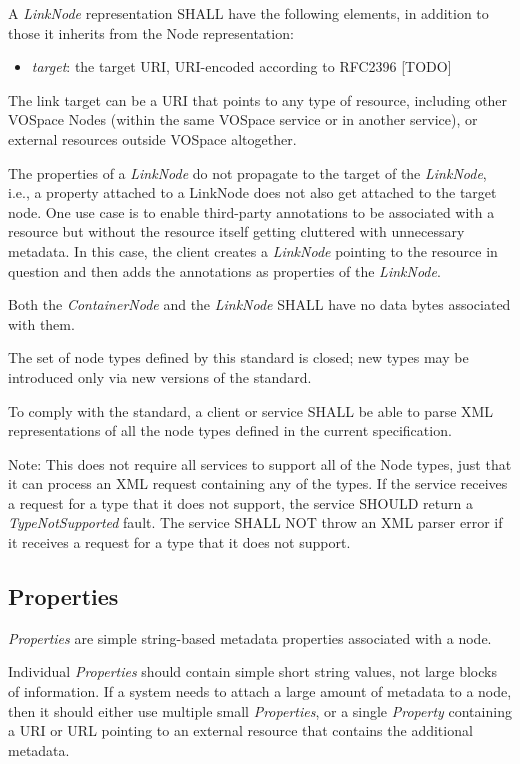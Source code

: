 \documentclass[11pt,a4paper]{ivoa}
\begin{document}
A \emph{LinkNode} representation SHALL have the following elements, in addition to those it inherits from the Node representation:

\begin{itemize}
    \item \emph{target}: the target URI, URI-encoded according to RFC2396 [TODO]
\end{itemize}

The link target can be a URI that points to any type of resource, including other VOSpace Nodes (within the same VOSpace service or in another service), or external resources outside VOSpace altogether.

The properties of a \emph{LinkNode} do not propagate to the target of the \emph{LinkNode}, i.e., a property attached to a LinkNode does not also get attached to the target node. One use case is to enable third-party annotations to be associated with a resource but without the resource itself getting cluttered with unnecessary metadata. In this case, the client creates a \emph{LinkNode} pointing to the resource in question and then adds the annotations as properties of the \emph{LinkNode}.

Both the \emph{ContainerNode} and the \emph{LinkNode} SHALL have no data bytes associated with them.

The set of node types defined by this standard is closed; new types may be introduced only via new versions of the standard.

To comply with the standard, a client or service SHALL be able to parse XML representations of all the node types defined in the current specification.

Note: This does not require all services to support all of the Node types, just that it can process an XML request containing any of the types. If the service receives a request for a type that it does not support, the service SHOULD return a \emph{TypeNotSupported} fault. The service SHALL NOT throw an XML parser error if it receives a request for a type that it does not support.

\subsection{Properties}
\label{subsec:properties}
\emph{Properties} are simple string-based metadata properties associated with a node.

Individual \emph{Properties} should contain simple short string values, not large blocks of information. If a system needs to attach a large amount of metadata to a node, then it should either use multiple small \emph{Properties}, or a single \emph{Property} containing a URI or URL pointing to an external resource that contains the additional metadata.
\end{document}
